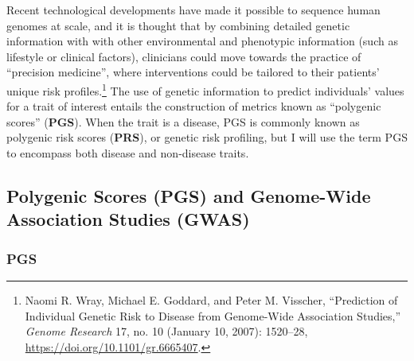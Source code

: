 \documentclass[
]{book}
\begin{document}
Recent technological developments have made it possible to sequence human genomes at scale, and it is thought that by combining detailed genetic information with with other environmental and phenotypic information (such as lifestyle or clinical factors), clinicians could move towards the practice of ``precision medicine'', where interventions could be tailored to their patients' unique risk profiles.\footnote{Naomi R. Wray, Michael E. Goddard, and Peter M. Visscher, {``Prediction of Individual Genetic Risk to Disease from Genome-Wide Association Studies,''} \emph{Genome Research} 17, no. 10 (January 10, 2007): 1520--28, \url{https://doi.org/10.1101/gr.6665407}.} The use of genetic information to predict individuals' values for a trait of interest entails the construction of metrics known as ``polygenic scores'' (\textbf{PGS}). When the trait is a disease, PGS is commonly known as polygenic risk scores (\textbf{PRS}), or genetic risk profiling, but I will use the term PGS to encompass both disease and non-disease traits.

\hypertarget{polygenic-scores-pgs-and-genome-wide-association-studies-gwas}{%
\subsection{Polygenic Scores (PGS) and Genome-Wide Association Studies (GWAS)}\label{polygenic-scores-pgs-and-genome-wide-association-studies-gwas}}

\hypertarget{pgs}{%
\subsubsection{PGS}\label{pgs}}
\end{document}

